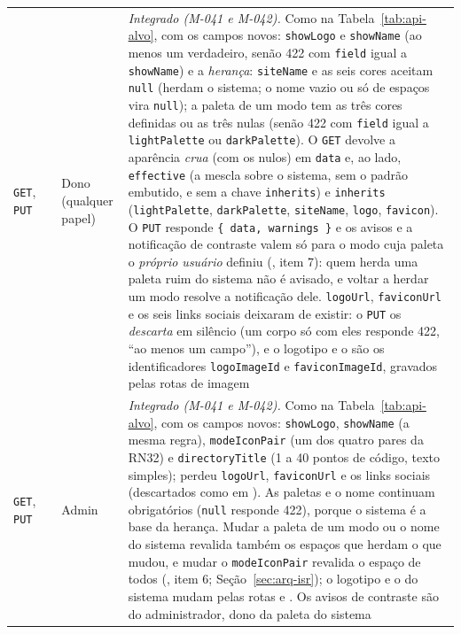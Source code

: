 \begin{longtable}{@{}L{1.5cm}L{4.1cm}L{2.1cm}L{6.1cm}@{}}
\texttt{GET}, \texttt{PUT} &  & Dono (qualquer papel) & \emph{Integrado (M-041 e M-042).} Como na Tabela~\ref{tab:api-alvo}, com os campos novos: \texttt{showLogo} e \texttt{showName} (ao menos um verdadeiro, senão 422 com \texttt{field} igual a \texttt{showName}) e a \emph{herança}: \texttt{siteName} e as seis cores aceitam \texttt{null} (herdam o sistema; o nome vazio ou só de espaços vira \texttt{null}); a paleta de um modo tem as três cores definidas ou as três nulas (senão 422 com \texttt{field} igual a \texttt{lightPalette} ou \texttt{darkPalette}). O \texttt{GET} devolve a aparência \emph{crua} (com os nulos) em \texttt{data} e, ao lado, \texttt{effective} (a mescla sobre o sistema, sem o padrão embutido, e sem a chave \texttt{inherits}) e \texttt{inherits} (\texttt{lightPalette}, \texttt{darkPalette}, \texttt{siteName}, \texttt{logo}, \texttt{favicon}). O \texttt{PUT} responde \texttt{\{ data, warnings \}} e os avisos e a notificação de contraste valem só para o modo cuja paleta o \emph{próprio usuário} definiu (, item 7): quem herda uma paleta ruim do sistema não é avisado, e voltar a herdar um modo resolve a notificação dele. \texttt{logoUrl}, \texttt{faviconUrl} e os seis links sociais deixaram de existir: o \texttt{PUT} os \emph{descarta} em silêncio (um corpo só com eles responde 422, ``ao menos um campo''), e o logotipo e o  são os identificadores \texttt{logoImageId} e \texttt{faviconImageId}, gravados pelas rotas de imagem\\[1pt]
\texttt{GET}, \texttt{PUT} &  & Admin & \emph{Integrado (M-041 e M-042).} Como na Tabela~\ref{tab:api-alvo}, com os campos novos: \texttt{showLogo}, \texttt{showName} (a mesma regra), \texttt{modeIconPair} (um dos quatro pares da RN32) e \texttt{directoryTitle} (1 a 40 pontos de código, texto simples); perdeu \texttt{logoUrl}, \texttt{faviconUrl} e os links sociais (descartados como em ). As paletas e o nome continuam obrigatórios (\texttt{null} responde 422), porque o sistema é a base da herança. Mudar a paleta de um modo ou o nome do sistema revalida também os espaços que herdam o que mudou, e mudar o \texttt{modeIconPair} revalida o espaço de todos (, item 6; Seção~\ref{sec:arq-isr}); o logotipo e o  do sistema mudam pelas rotas  e . Os avisos de contraste são do administrador, dono da paleta do sistema\\[1pt]
\end{longtable}

